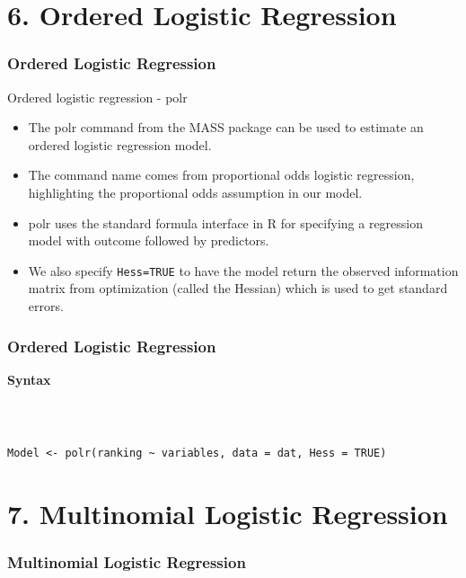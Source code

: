 \documentclass{beamer}
\begin{document}
\section*{6. Ordered Logistic Regression}
\begin{frame}[fragile]
\frametitle{Ordered Logistic Regression}
\Large

Ordered logistic regression - polr

\begin{itemize}
\item The polr command from the MASS package can be used to estimate an ordered logistic regression model.

\item The command name comes from proportional odds logistic regression, highlighting the proportional odds assumption in our model.

\item polr uses the standard formula interface in R for specifying a regression model with outcome followed by predictors.

\item We also specify \texttt{Hess=TRUE} to have the model return the observed information matrix from optimization (called the Hessian) which is used to get standard errors.
\end{itemize}



\end{frame}
\begin{frame}[fragile]
\frametitle{Ordered Logistic Regression}
\Large
\textbf{Syntax}
\begin{verbatim}



Model <- polr(ranking ~ variables, data = dat, Hess = TRUE)
\end{verbatim}

\end{frame}
\section*{7. Multinomial Logistic Regression}
\begin{frame}[fragile]
\frametitle{Multinomial Logistic Regression}
\Large


\end{frame}
\end{document}
